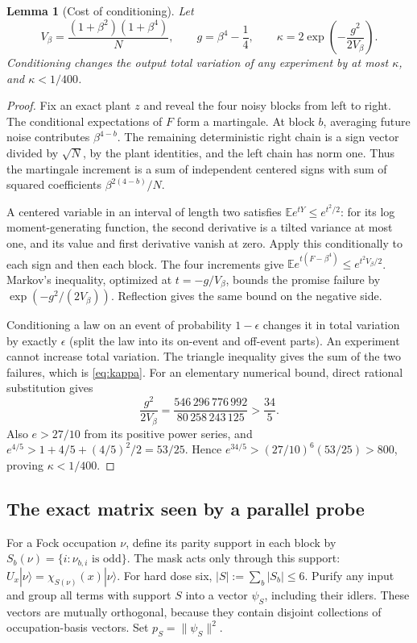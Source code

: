 \documentclass[11pt]{article}
\newtheorem{lemma}[theorem]{Lemma}
\newcommand{\E}{\mathbb E}
\newcommand{\1}{\mathbf 1}
\begin{document}
\begin{lemma}[Cost of conditioning]\label{lem:conditioning}
Let
\begin{equation}\label{eq:kappa}
 V_\beta=\frac{(1+\beta^2)(1+\beta^4)}N,\qquad
 g=\beta^4-\frac14,\qquad
 \kappa=2\exp\left(-\frac{g^2}{2V_\beta}\right).
\end{equation}
Conditioning changes the output total variation of any experiment
by at most $\kappa$, and $\kappa<1/400$.
\end{lemma}
\begin{proof}
Fix an exact plant $z$ and reveal the four noisy blocks from left to
right. The conditional expectations of $F$ form a martingale.
At block $b$, averaging future noise contributes $\beta^{4-b}$.
The remaining deterministic right chain is a sign vector divided by
$\sqrt N$, by the plant identities, and the left chain has norm one.
Thus the martingale increment is a sum of independent centered signs
with sum of squared coefficients $\beta^{2(4-b)}/N$.

A centered variable in an interval of length two satisfies
$\E e^{tY}\le e^{t^2/2}$: for its log moment-generating function,
the second derivative is a tilted variance at most one, and its value
and first derivative vanish at zero. Apply this conditionally to each
sign and then each block. The four increments give
$\E e^{t(F-\beta^4)}\le e^{t^2V_\beta/2}$.
Markov's inequality, optimized at $t=-g/V_\beta$, bounds the promise
failure by $\exp(-g^2/(2V_\beta))$. Reflection gives the same bound
on the negative side.

Conditioning a law on an event of probability $1-\epsilon$ changes
it in total variation by exactly $\epsilon$ (split the law into its
on-event and off-event parts). An experiment cannot increase total
variation. The triangle inequality gives the sum of the two failures,
which is \eqref{eq:kappa}.
For an elementary numerical bound, direct rational substitution gives
\[
 \frac{g^2}{2V_\beta}
   =\frac{546\,296\,776\,992}{80\,258\,243\,125}>\frac{34}{5}.
\]
Also $e>27/10$ from its positive power series, and
$e^{4/5}>1+4/5+(4/5)^2/2=53/25$. Hence
$e^{34/5}>(27/10)^6(53/25)>800$, proving $\kappa<1/400$.
\end{proof}

\subsection{The exact matrix seen by a parallel probe}
For a Fock occupation $\nu$, define its parity support in each block by
$S_b(\nu)=\{i:\nu_{b,i}\text{ is odd}\}$.
The mask acts only through this support:
$U_x|\nu\rangle=\chi_{S(\nu)}(x)|\nu\rangle$.
For hard dose six, $|S|:=\sum_b|S_b|\le6$.
Purify any input and group all terms with support $S$ into a vector
$\psi_S$, including their idlers. These vectors are mutually orthogonal,
because they contain disjoint collections of occupation-basis vectors.
Set $p_S=\|\psi_S\|^2$.
\end{document}
